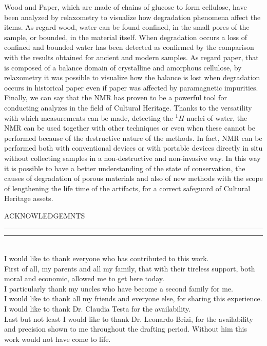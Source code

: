 \documentclass[a4paper,11pt]{report}
\begin{document}
Wood and Paper, which are made of chains of glucose to form cellulose, have been analyzed by relaxometry to visualize how degradation phenomena affect the items. As regard wood, water can be found confined, in the small pores of the sample, or bounded, in the material itself. When degradation occurs a loss of confined and bounded water has been detected as confirmed by the comparison with the results obtained for ancient and modern samples. As regard paper, that is composed of a balance domain of crystalline and amorphous cellulose, by relaxometry it was possible to visualize how the balance is lost when degradation occurs in historical paper even if paper was affected by paramagnetic impurities.\\
 Finally, we can say that the NMR has proven to be a powerful tool for conducting analyzes in the field of Cultural Heritage. Thanks to the versatility with which measurements can be made, detecting the $^1H$ nuclei of water, the NMR can be used together with other techniques or even when these cannot be performed because of the destructive nature of the methods. In fact, NMR can be performed both with conventional devices or with portable devices directly in situ without collecting samples in a non-destructive and non-invasive way. In this way it is possible to have a better understanding of the state of conservation, the causes of degradation of porous materials and also of new methods with the scope of lengthening the life time of the artifacts, for a correct safeguard of Cultural Heritage assets.




\clearpage





\clearpage
\thispagestyle{empty}
\begin{center}
	{{\Large{\textsc{ACKNOWLEDGEMNTS}}}} 
\rule[0.1cm]{15.8cm}{0.1mm}
\rule[0.5cm]{15.8cm}{0.6mm}
\\\vspace{3mm}
I would like to thank everyone who has contributed to this work.
\\
First of all, my parents and all my family, that with their tireless support, both moral and economic, allowed me to get here today.\\
I particularly thank my uncles who have become a second family for me.\\
I would like to thank all my friends and everyone else, for sharing this experience.\\
I would like to thank Dr. Claudia Testa for the availability.\\
Last but not least I would like to thank Dr. Leonardo Brizi, for the availability and precision shown to me throughout the drafting period. Without him this work would not have come to life.

\end{center}
\end{document}
